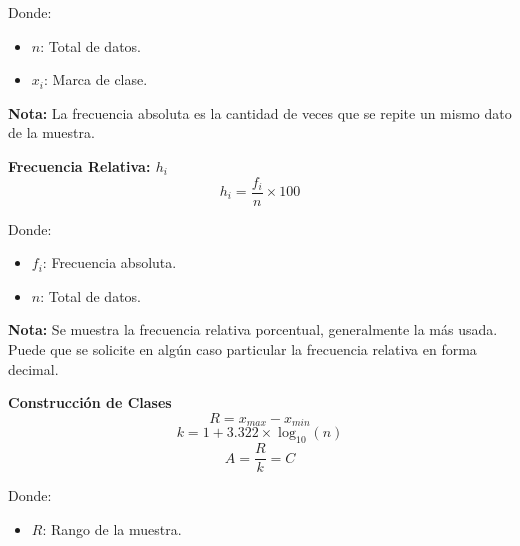 \documentclass[11pt, a4paper]{article}
\newenvironment{frecuenciaAbsoluta}{}{}
\newenvironment{frecuenciaRelativa}{}{}
\newenvironment{construccionDeClases}{}{}
\begin{document}
\begin{multicols}{2}
\begin{frecuenciaAbsoluta}
        \vspace{-1cm}
        Donde:
        \begin{itemize}
            \item $n$: Total de datos.
            \item $x_i$: Marca de clase.
        \end{itemize}
        \textbf{Nota:}
        La frecuencia absoluta es la cantidad de veces que se repite un mismo dato de la muestra.
    \end{frecuenciaAbsoluta}
    \begin{frecuenciaRelativa}
        \begin{center}
            \textbf{\large Frecuencia Relativa: $h_i$}
            \hrulefill
            \begin{equation*}
                h_i = \frac{f_i}{n} \times 100
            \end{equation*}
        \end{center}
        \vspace{-1cm}
        Donde:
        \begin{itemize}
            \item $f_i$: Frecuencia absoluta.
            \item $n$: Total de datos.
        \end{itemize}
        \textbf{Nota:}
        Se muestra la frecuencia relativa porcentual, generalmente la más usada. Puede que se solicite en algún caso particular la frecuencia relativa en forma decimal.
    \end{frecuenciaRelativa}
    \begin{construccionDeClases}
        \begin{center}
            \textbf{\large Construcción de Clases}
            \hrulefill
            \begin{equation*}
                R = x_{max} - x_{min}
            \end{equation*}
            \begin{equation*}
                k = 1 + 3.322 \times \log_{10}(n)
            \end{equation*}
            \begin{equation*}
                A = \frac{R}{k} = C
            \end{equation*}
        \end{center}
        \vspace{-1cm}
        Donde:
        \begin{itemize}
            \item $R$: Rango de la muestra.

\end{itemize}
\end{construccionDeClases}
\end{multicols}
\end{document}
